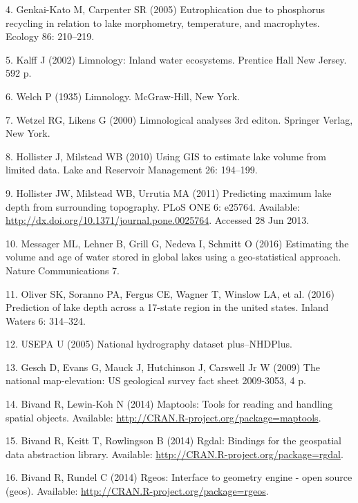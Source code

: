 \documentclass[11pt,]{article}
\begin{document}
\hypertarget{ref-genkai2005eutrophication}{}
4. Genkai-Kato M, Carpenter SR (2005) Eutrophication due to phosphorus
recycling in relation to lake morphometry, temperature, and macrophytes.
Ecology 86: 210--219.

\hypertarget{ref-kalff2002limnology}{}
5. Kalff J (2002) Limnology: Inland water ecosystems. Prentice Hall New
Jersey. 592 p.

\hypertarget{ref-welch1935limnology}{}
6. Welch P (1935) Limnology. McGraw-Hill, New York.

\hypertarget{ref-wetzel2000limnological}{}
7. Wetzel RG, Likens G (2000) Limnological analyses 3rd editon. Springer
Verlag, New York.

\hypertarget{ref-hollister2010volume}{}
8. Hollister J, Milstead WB (2010) Using GIS to estimate lake volume
from limited data. Lake and Reservoir Management 26: 194--199.

\hypertarget{ref-hollister2011predicting}{}
9. Hollister JW, Milstead WB, Urrutia MA (2011) Predicting maximum lake
depth from surrounding topography. PLoS ONE 6: e25764. Available:
\url{http://dx.doi.org/10.1371/journal.pone.0025764}. Accessed 28 Jun
2013.

\hypertarget{ref-messager2016estimating}{}
10. Messager ML, Lehner B, Grill G, Nedeva I, Schmitt O (2016)
Estimating the volume and age of water stored in global lakes using a
geo-statistical approach. Nature Communications 7.

\hypertarget{ref-oliver2016prediction}{}
11. Oliver SK, Soranno PA, Fergus CE, Wagner T, Winslow LA, et al.
(2016) Prediction of lake depth across a 17-state region in the united
states. Inland Waters 6: 314--324.

\hypertarget{ref-usepa2005national}{}
12. USEPA U (2005) National hydrography dataset plus--NHDPlus.

\hypertarget{ref-gesch2009national}{}
13. Gesch D, Evans G, Mauck J, Hutchinson J, Carswell Jr W (2009) The
national map-elevation: US geological survey fact sheet 2009-3053, 4 p.

\hypertarget{ref-bivand2014maptools}{}
14. Bivand R, Lewin-Koh N (2014) Maptools: Tools for reading and
handling spatial objects. Available:
\url{http://CRAN.R-project.org/package=maptools}.

\hypertarget{ref-bivand2014rgdal}{}
15. Bivand R, Keitt T, Rowlingson B (2014) Rgdal: Bindings for the
geospatial data abstraction library. Available:
\url{http://CRAN.R-project.org/package=rgdal}.

\hypertarget{ref-bivand2014rgeos}{}
16. Bivand R, Rundel C (2014) Rgeos: Interface to geometry engine - open
source (geos). Available: \url{http://CRAN.R-project.org/package=rgeos}.
\end{document}
